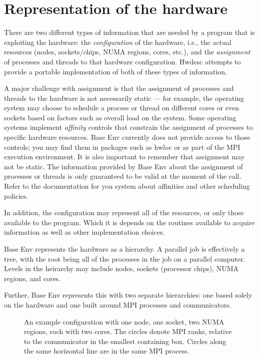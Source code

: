 \documentclass[11pt,letterpaper]{report}
\begin{document}
\section{Representation of the hardware}
There are two different types of information that are needed by a
program that is exploiting the hardware: the \emph{configuration} of
the hardware, i.e., the actual resources (nodes, sockets/chips, NUMA
regions, cores, etc.), and the \emph{assignment} of processes and
threads to that hardware configuration.
Hwdesc attempts to provide a portable implementation of both of these
types of information.

A major challenge with assignment is that the assignment of processes
and threads to the hardware is not necessarily static --- for example,
the operating system may choose to schedule a process or thread on
different cores or even sockets based on factors such as overall load
on the system.
Some operating systems implement \emph{affinity} controls that
constrain the assignment of processes to specific hardware resources.
Base Env currently does not provide access to those controls; you may
find them in packages such as hwloc or as part of the MPI execution
environment.
It is also important to remember that assignment may not be static.
The information provided by Base Env about the assignment of
processes or threads is only guaranteed to be valid at the moment of
the call.
Refer to the documentation for you system about affinities and other
scheduling policies.

In addition, the configuration may represent all of the resources, or
only those available to the program.
Which it is depends on the routines available to acquire information
as well as other implementation choices.

Base Env represents the hardware as a hierarchy.
A parallel job is effectively a tree, with the root being all of the
processes in the job on a parallel computer.
Levels in the heirarchy may include nodes, sockets (processor chips),
NUMA regions, and cores.

Further, Base Env represents this with two separate hierarchies: one
based solely on the hardware and one built around MPI processes and
communicators.

\begin{figure}
\begin{center}

\end{center}
\caption{An example configuration with one node, one socket, two NUMA
  regions, each with two cores. The circles denote MPI ranks, relative
to the communicator in the smallest containing box. Circles along the
same horizontal line are in the same MPI process.}
\label{fig:hwdesc}
\end{figure}
\end{document}
